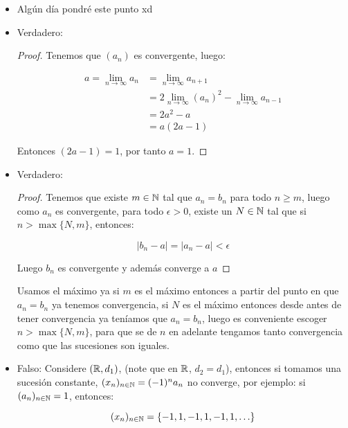 \begin{itemize}[label={✎},leftmargin=*]
    \item Algún día pondré este punto xd

    \item Verdadero:\\

    \begin{proof}
    Tenemos que $(a_n)$ es convergente, luego:

    \begin{align*}
        a=\lim_{n \to \infty} a_n&=\lim_{n \to \infty} a_{n+1}\\
        &=2\lim_{n \to \infty}(a_n)^2-\lim_{n \to \infty} a_{n-1}\\
        &=2a^2-a\\
        &=a(2a-1)
    \end{align*}
    
    Entonces $(2a-1)=1$, por tanto $a=1$.
    \end{proof}


    \item Verdadero:\\

    \begin{proof}
    Tenemos que existe $m\in \mathbb{N}$ tal que $a_n=b_n$ para todo $n\geq m$, luego como $a_n$ es convergente, para todo $\epsilon>0$, existe un $N\in \mathbb{N}$ tal que si $n>\max\{N,m\}$, entonces:

    $$|b_n-a|=|a_n-a|<\epsilon$$

    Luego $b_n$ es convergente y además converge a $a$
    \end{proof}

\begin{note}
Usamos el máximo ya si $m$ es el máximo entonces a partir del punto en que $a_n=b_n$ ya tenemos convergencia, si $N$ es el máximo entonces desde antes de tener convergencia ya teníamos que $a_n=b_n$, luego es conveniente escoger $n>\max\{N,m\}$, para que se de $n$ en adelante tengamos tanto convergencia como que las sucesiones son iguales.
\end{note}
    
    \item Falso: Considere $(\mathbb{R},d_1)$, (note que en $\mathbb{R}$, $d_2=d_1$), entonces si tomamos una sucesión constante, $(x_n)_{n\in\mathbb{N}}=(-1)^na_n$ no converge, por ejemplo: si $(a_n)_{n\in \mathbb{N}}=1$, entonces:

    $$(x_n)_{n\in \mathbb{N}}=\{-1,1,-1,1,-1,1,\ldots\}$$ 


\end{itemize}

